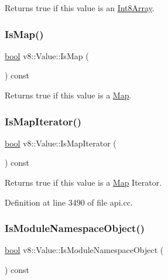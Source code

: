 Returns true if this value is an \mbox{\hyperlink{classv8_1_1Int8Array}{Int8\+Array}}. \mbox{\label{classv8_1_1Value_a85e4e8455cbd60c9b0a1dc91030383e6}} 
\subsubsection{\texorpdfstring{Is\+Map()}{IsMap()}}
{\footnotesize\ttfamily \mbox{\hyperlink{classbool}{bool}} v8\+::\+Value\+::\+Is\+Map (\begin{DoxyParamCaption}{ }\end{DoxyParamCaption}) const}

Returns true if this value is a \mbox{\hyperlink{classv8_1_1Map}{Map}}. \mbox{\label{classv8_1_1Value_a761b2fd0aa8c2f59c879741336eb2f66}} 
\subsubsection{\texorpdfstring{Is\+Map\+Iterator()}{IsMapIterator()}}
{\footnotesize\ttfamily \mbox{\hyperlink{classbool}{bool}} v8\+::\+Value\+::\+Is\+Map\+Iterator (\begin{DoxyParamCaption}{ }\end{DoxyParamCaption}) const}

Returns true if this value is a \mbox{\hyperlink{classv8_1_1Map}{Map}} Iterator. 

Definition at line 3490 of file api.\+cc.

\mbox{\label{classv8_1_1Value_aa6c9cb065da30b0b58b929ecaa80a1ab}} 
\subsubsection{\texorpdfstring{Is\+Module\+Namespace\+Object()}{IsModuleNamespaceObject()}}
{\footnotesize\ttfamily \mbox{\hyperlink{classbool}{bool}} v8\+::\+Value\+::\+Is\+Module\+Namespace\+Object (\begin{DoxyParamCaption}{ }\end{DoxyParamCaption}) const}

